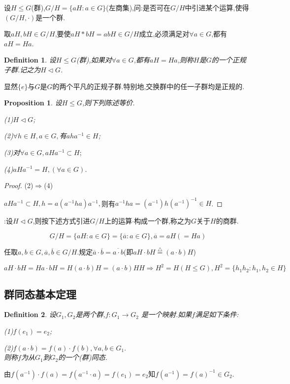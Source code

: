 \documentclass[UTF8]{article}
\newtheorem{defn}{Definition}[section]
\newtheorem{prop}{Proposition}[section]
\begin{document}
设$H\le G$(群),$G/H=\{aH:a\in G\}$(左商集),问:是否可在$G/H$中引进某个运算,使得$(G/H,\cdot)$是一个群.

取$aH,bH\in G/H$,要使$aH\ast bH=abH\in G/H$成立,必须满足对$\forall a\in G$,都有$aH=Ha$.

\begin{defn}
	\quad 设$H\le G$(群),如果对$\forall a\in G$,都有$aH=Ha$,则称$H$是$G$的一个正规子群.记之为$H\triangleleft G$.
\end{defn}
显然$\{e\}$与$G$是$G$的两个平凡的正规子群.特别地,交换群中的任一子群均是正规的.

\begin{prop}
	\quad 设$H\le G$,则下列陈述等价.
	
	(1)$H\triangleleft G$;
	
	(2)$\forall h\in H,a\in G,$有$aha^{-1}\in H$;
	
	(3)对$\forall a\in G,aHa^{-1}\subset H;$
	
	(4)$aHa^{-1}=H,(\forall a\in G)$.
\end{prop}
\begin{proof}
	(2)$\Rightarrow$(4)
	
	$aHa^{-1}\subset H,h=a(a^{-1}ha)a^{-1},$则有$a^{-1}ha=(a^{-1})h(a^{-1})^{-1}\in H$.
\end{proof}
:设$H\triangleleft G$,则按下述方式引进$G/H$上的运算$\cdot$构成一个群,称之为$G$关于$H$的商群.

$$G/H=\{aH:a\in G\}=\{\overline{a}:a\in G\},\overline{a}=aH(=Ha)$$

任取$a,b\in G,\overline{a},\overline{b}\in G/H$.规定$\overline{a}\cdot\overline{b}=\overline{a\cdot b}$(即$aH\cdot bH\stackrel{\bigtriangleup}{=}(a\cdot b)H$)

$aH\cdot bH=Ha\cdot bH=H(a\cdot b)H=(a\cdot b)HH\Rightarrow H^2=H(H\le G),H^2=\{h_1h_2:h_1,h_2\in H\}$


\subsection{群同态基本定理}
\normalsize
\begin{defn}
	设$G_1,G_2$是两个群,$f:G_1\to G_2$  是一个映射.如果$f$满足如下条件:
	
	(1)$f(e_1)=e_2$;
	
	(2)$f(a\cdot b)=f(a)\cdot f(b),\forall a,b\in G_1.$\\
	则称$f$为从$G_1$到$G_2$的一个(群)同态.
\end{defn}

由$f(a^{-1})\cdot f(a)=f({a^{-1}}\cdot a)=f(e_1)=e_2$知$f(a^{-1})={f(a)}^{-1}\in G_2$.
\end{document}
